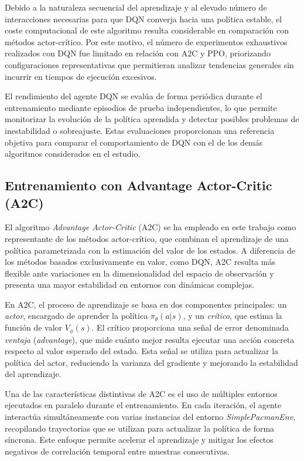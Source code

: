 Debido a la naturaleza secuencial del aprendizaje y al elevado número de interacciones necesarias para que DQN converja hacia una política estable, el coste computacional de este algoritmo resulta considerable en comparación con métodos actor-crítico. Por este motivo, el número de experimentos exhaustivos realizados con DQN fue limitado en relación con A2C y PPO, priorizando configuraciones representativas que permitieran analizar tendencias generales sin incurrir en tiempos de ejecución excesivos.

El rendimiento del agente DQN se evalúa de forma periódica durante el entrenamiento mediante episodios de prueba independientes, lo que permite monitorizar la evolución de la política aprendida y detectar posibles problemas de inestabilidad o sobreajuste. Estas evaluaciones proporcionan una referencia objetiva para comparar el comportamiento de DQN con el de los demás algoritmos considerados en el estudio.

\subsection{Entrenamiento con Advantage Actor-Critic (A2C)}

El algoritmo \textit{Advantage Actor-Critic} (A2C) se ha empleado en este trabajo como representante de los métodos actor-crítico, que combinan el aprendizaje de una política parametrizada con la estimación del valor de los estados. A diferencia de los métodos basados exclusivamente en valor, como DQN, A2C resulta más flexible ante variaciones en la dimensionalidad del espacio de observación y presenta una mayor estabilidad en entornos con dinámicas complejas.

En A2C, el proceso de aprendizaje se basa en dos componentes principales: un \textit{actor}, encargado de aprender la política $\pi_\theta(a|s)$, y un \textit{crítico}, que estima la función de valor $V_\phi(s)$. El crítico proporciona una señal de error denominada \textit{ventaja} (\textit{advantage}), que mide cuánto mejor resulta ejecutar una acción concreta respecto al valor esperado del estado. Esta señal se utiliza para actualizar la política del actor, reduciendo la varianza del gradiente y mejorando la estabilidad del aprendizaje.

Una de las características distintivas de A2C es el uso de múltiples entornos ejecutados en paralelo durante el entrenamiento. En cada iteración, el agente interactúa simultáneamente con varias instancias del entorno \textit{SimplePacmanEnv}, recopilando trayectorias que se utilizan para actualizar la política de forma síncrona. Este enfoque permite acelerar el aprendizaje y mitigar los efectos negativos de correlación temporal entre muestras consecutivas.

